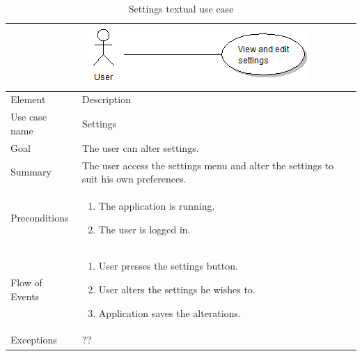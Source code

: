 \begin{table}
\begin{tabular}{p{3cm}p{12cm}}
& \includegraphics{settings}\\ \hline
Element & Description \\ \hline
Use case name & Settings \\
Goal & The user can alter settings. \\
Summary & The user access the settings menu and alter the settings to suit his own preferences. \\
Preconditions &
\begin{enumerate}
\item{}The application is running.
\item{}The user is logged in.
\end{enumerate} \\ \hline
Flow of Events &
\begin{enumerate}
\item{}User presses the settings button.
\item{}User alters the settings he wishes to.
\item{}Application saves the alterations.
\end{enumerate} \\ \hline
Exceptions & ??
\end{tabular}
\caption{Settings textual use case} \label{tab:settings}
\end{table}